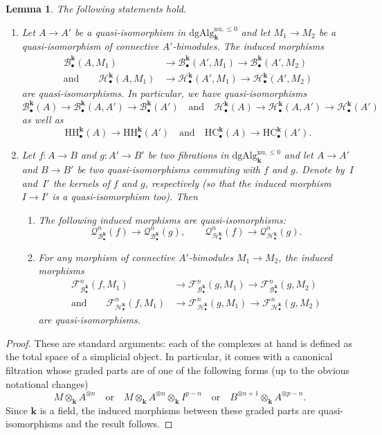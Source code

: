 \documentclass[JEP,XML,SOM,Unicode,NoEqCountersInSection]{cedram}
\let\mathcal\mathscr
\newenvironment{assertions}
{\bgroup\def\theenumi{\alph{enumi}}\begin{enumerate}}
{\end{enumerate}\egroup}
\newcommand{\sbullet}{{\scriptscriptstyle\bullet}}
\newtheorem{lem}[thm]{Lemma}
\theoremstyle{definition}
\newcommand{\Bc}{\mathcal{B}}
\newcommand{\Qc}{\mathcal{Q}}
\newcommand{\Hc}{\mathcal{H}}
\newcommand{\Fc}{\mathcal{F}}
\newcommand{\MCdgAlg}{\mathrm{dgAlg}}
\newcommand{\HC}{\mathrm{HC}}
\newcommand{\HH}{\mathrm{HH}}
\renewcommand{\k}{{\boldsymbol{k}}}
\begin{document}
\pagebreak[2]
\begin{lem} The following statements hold.
\begin{enumerate}
\item Let $A \to A'$ be a quasi-isomorphism in $\MCdgAlg_\k^{\mathrm{nu},\leq 0}$ and let $M_1 \to M_2$ be a quasi-isomorphism of connective $A'$-bimodules.
The induced morphisms
\begin{align*}
\Bc_\sbullet^\k(A,M_1) &\to \Bc_\sbullet^\k(A',M_1) \to \Bc_\sbullet^\k(A',M_2) \\
\text{and}\qquad \Hc_\sbullet^\k(A,M_1) &\to \Hc_\sbullet^\k(A',M_1) \to \Hc_\sbullet^\k(A',M_2)
\end{align*}
are quasi-isomorphisms.
In particular, we have quasi-isomorphisms
\[
\Bc_\sbullet^\k(A) \to \Bc_\sbullet^\k(A,A') \to \Bc_\sbullet^\k(A')\quad\text{and}\quad\Hc_\sbullet^\k(A) \to \Hc_\sbullet^\k(A,A') \to \Hc_\sbullet^\k(A')
\]
as well as
\[
\HH_\sbullet^\k(A) \to \HH_\sbullet^\k(A')\quad\text{and}\quad\HC_\sbullet^\k(A) \to \HC_\sbullet^\k(A').
\]

\item Let $f \colon A \to B$ and $g \colon A' \to B'$ be two fibrations in $\MCdgAlg_\k^{\mathrm{nu},\leq 0}$ and let $A \to A'$ and $B \to B'$ be two quasi-isomorphisms commuting with $f$ and $g$. Denote by~$I$ and~$I'$ the kernels of $f$ and $g$, respectively (so that the induced morphism $I \to I'$ is a quasi-isomorphism too). Then
\begin{assertions}
\item The following induced morphisms are quasi-isomorphisms:
\[
\Qc_{\Bc_\sbullet^\k}^n(f) \to \Qc_{\Bc_\sbullet^\k}^n(g), \qquad \Qc_{\Hc_\sbullet^\k}^n(f) \to \Qc_{\Hc_\sbullet^\k}^n(g).
\]
\item For any morphism of connective $A'$-bimodules $M_1 \to M_2$, the induced morphisms
\begin{align*}
\Fc_{\Bc_\sbullet^\k}^{n}(f,M_1) &\to \Fc_{\Bc_\sbullet^\k}^{n}(g,M_1) \to \Fc_{\Bc_\sbullet^\k}^{n}(g,M_2) \\
\text{and}\qquad
\Fc_{\Hc_\sbullet^\k}^{n}(f,M_1) &\to \Fc_{\Hc_\sbullet^\k}^{n}(g,M_1) \to \Fc_{\Hc_\sbullet^\k}^{n}(g,M_2)
\end{align*}
are quasi-isomorphisms.
\end{assertions}
\end{enumerate}
\end{lem}

\begin{proof}
These are standard arguments: each of the complexes at hand is defined as the total space of a simplicial object. In particular, it comes with a canonical filtration whose graded parts are of one of the following forms (up to the obvious notational changes)
\[
M \otimes_\k A^{\otimes n} \quad\text{or}\quad M \otimes_\k A^{\otimes n} \otimes_\k I^{p-n} \quad\text{or}\quad B^{\otimes n+1} \otimes_\k A^{\otimes p-n}.
\]
Since $\k$ is a field, the induced morphisms between these graded parts are quasi-isomorphisms and the result follows.
\end{proof}
\end{document}
